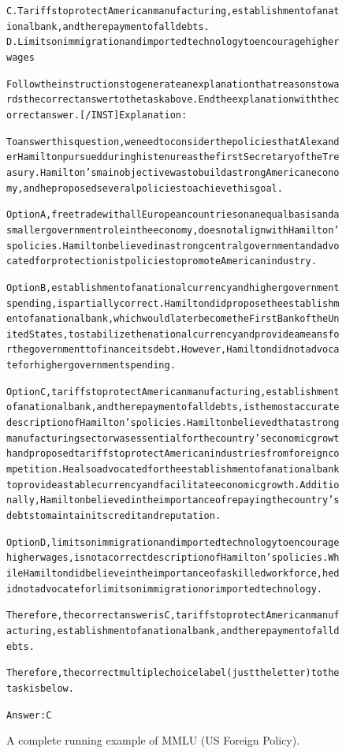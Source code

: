\begin{figure}[t]
{{\begin{alltt}
C. Tariffs to protect American manufacturing, establishment of a national bank, and the repayment of all debts.
D. Limits on immigration and imported technology to encourage higher wages

Follow the instructions to generate an explanation that reasons towards the correct answer to the task above. End the explanation with the correct answer. [/INST] Explanation: 

To answer this question, we need to consider the policies that Alexander Hamilton pursued during his tenure as the first Secretary of the Treasury. Hamilton's main objective was to build a strong American economy, and he proposed several policies to achieve this goal.

Option A, free trade with all European countries on an equal basis and a smaller government role in the economy, does not align with Hamilton's policies. Hamilton believed in a strong central government and advocated for protectionist policies to promote American industry.

Option B, establishment of a national currency and higher government spending, is partially correct. Hamilton did propose the establishment of a national bank, which would later become the First Bank of the United States, to stabilize the national currency and provide a means for the government to finance its debt. However, Hamilton did not advocate for higher government spending.

Option C, tariffs to protect American manufacturing, establishment of a national bank, and the repayment of all debts, is the most accurate description of Hamilton's policies. Hamilton believed that a strong manufacturing sector was essential for the country's economic growth and proposed tariffs to protect American industries from foreign competition. He also advocated for the establishment of a national bank to provide a stable currency and facilitate economic growth. Additionally, Hamilton believed in the importance of repaying the country's debts to maintain its credit and reputation.

Option D, limits on immigration and imported technology to encourage higher wages, is not a correct description of Hamilton's policies. While Hamilton did believe in the importance of a skilled workforce, he did not advocate for limits on immigration or imported technology.

Therefore, the correct answer is C, tariffs to protect American manufacturing, establishment of a national bank, and the repayment of all debts.

Therefore, the correct multiple choice label (just the letter) to the task is below.

Answer: C
\end{alltt}
}}
\caption{A complete running example of MMLU (US Foreign Policy).}
\label{fig:mmlu_subject=us_foreign_policy_example}
\end{figure}
